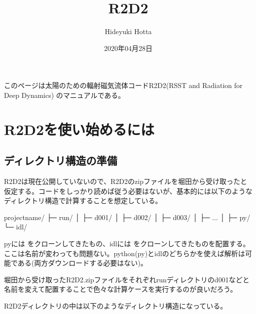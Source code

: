 \documentclass[letterpaper,10pt,dvipdfmx,report]{sphinxmanual}
\title{R2D2}
\date{2020年04月28日}
\author{Hideyuki Hotta}
\let\sphinxpxdimen\pdfpxdimen\else\newdimen\sphinxpxdimen
\begin{document}
\pagestyle{empty}
\sphinxmaketitle
\pagestyle{plain}
\sphinxtableofcontents
\pagestyle{normal}
\label{\detokenize{index::doc}}


このページは太陽のための輻射磁気流体コードR2D2(RSST and Radiation for Deep Dynamics)
のマニュアルである。


\noindent\sphinxincludegraphics[width=350\sphinxpxdimen]{{R2D2_logo_red}.png}


\chapter{R2D2を使い始めるには}
\label{\detokenize{start:r2d2}}\label{\detokenize{start::doc}}

\section{ディレクトリ構造の準備}
\label{\detokenize{start:id1}}
R2D2は現在公開していないので、R2D2のzipファイルを堀田から受け取ったと仮定する。コードをしっかり読めば従う必要はないが、基本的には以下のようなディレクトリ構造で計算することを想定している。

\begin{sphinxVerbatim}[commandchars=\\\{\}]
project\PYGZus{}name/
           ├─ run/
           │    ├─ d001/
           │    ├─ d002/
           │    ├─ d003/
           │    ├─ ...
           │
           ├─ py/
           └─ idl/
\end{sphinxVerbatim}

pyには  をクローンしてきたもの、idlには  をクローンしてきたものを配置する。ここは名前が変わっても問題ない。python(py)とidlのどちらかを使えば解析は可能である(両方ダウンロードする必要はない)。

堀田から受け取ったR2D2.zipファイルをそれぞれrunディレクトリのd001などと名前を変えて配置することで色々な計算ケースを実行するのが良いだろう。

R2D2ディレクトリの中は以下のようなディレクトリ構造になっている。
\end{document}
